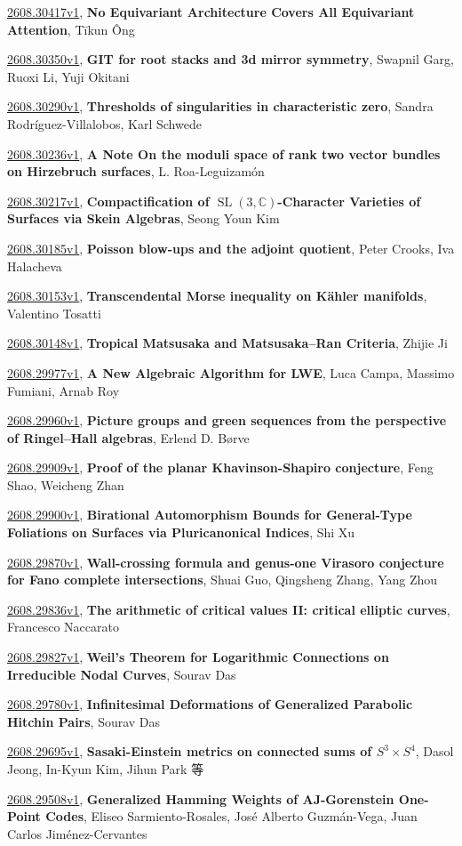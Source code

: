 \documentclass[9pt, a4paper]{article}
\theoremstyle{plain}
\theoremstyle{definition}
\theoremstyle{remark}
\newcommand{\arxiv}[3]{\href{https://arxiv.org/abs/#1}{#1}, \textbf{\textcolor{arxivblue}{#2}}, #3}
\begin{document}
\arxiv{2608.30417v1}{No Equivariant Architecture Covers All Equivariant Attention}{Tīkun Ông}

\arxiv{2608.30350v1}{GIT for root stacks and 3d mirror symmetry}{Swapnil Garg, Ruoxi Li, Yuji Okitani}

\arxiv{2608.30290v1}{Thresholds of singularities in characteristic zero}{Sandra Rodríguez-Villalobos, Karl Schwede}

\arxiv{2608.30236v1}{A Note On the moduli space of rank two vector bundles on Hirzebruch surfaces}{L. Roa-Leguizamón}

\arxiv{2608.30217v1}{Compactification of $\operatorname{SL}(3,\mathbb{C})$-Character Varieties of Surfaces via Skein Algebras}{Seong Youn Kim}

\arxiv{2608.30185v1}{Poisson blow-ups and the adjoint quotient}{Peter Crooks, Iva Halacheva}

\arxiv{2608.30153v1}{Transcendental Morse inequality on Kähler manifolds}{Valentino Tosatti}

\arxiv{2608.30148v1}{Tropical Matsusaka and Matsusaka--Ran Criteria}{Zhijie Ji}

\arxiv{2608.29977v1}{A New Algebraic Algorithm for LWE}{Luca Campa, Massimo Fumiani, Arnab Roy}

\arxiv{2608.29960v1}{Picture groups and green sequences from the perspective of Ringel--Hall algebras}{Erlend D. Børve}

\arxiv{2608.29909v1}{Proof of the planar Khavinson-Shapiro conjecture}{Feng Shao, Weicheng Zhan}

\arxiv{2608.29900v1}{Birational Automorphism Bounds for General-Type Foliations on Surfaces via Pluricanonical Indices}{Shi Xu}

\arxiv{2608.29870v1}{Wall-crossing formula and genus-one Virasoro conjecture for Fano complete intersections}{Shuai Guo, Qingsheng Zhang, Yang Zhou}

\arxiv{2608.29836v1}{The arithmetic of critical values II: critical elliptic curves}{Francesco Naccarato}

\arxiv{2608.29827v1}{Weil's Theorem for Logarithmic Connections on Irreducible Nodal Curves}{Sourav Das}

\arxiv{2608.29780v1}{Infinitesimal Deformations of Generalized Parabolic Hitchin Pairs}{Sourav Das}

\arxiv{2608.29695v1}{Sasaki-Einstein metrics on connected sums of $S^3\times S^4$}{Dasol Jeong, In-Kyun Kim, Jihun Park 等}

\arxiv{2608.29508v1}{Generalized Hamming Weights of AJ-Gorenstein One-Point Codes}{Eliseo Sarmiento-Rosales, José Alberto Guzmán-Vega, Juan Carlos Jiménez-Cervantes}
\end{document}
